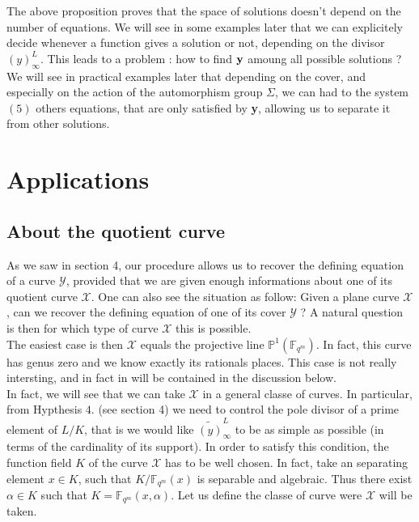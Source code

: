 \documentclass[10pt]{article}
\newcommand{\s}{\vspace{0.3cm}}
\newcommand{\fqm}{\mathbb{F}_{q^m}}
\newcommand{\X}{\mathcal{X}}
\newcommand{\Y}{\mathcal{Y}}
\begin{document}
\s

The above proposition proves that the space of solutions doesn't depend on the number of equations. 
We will see in some examples later that we can explicitely decide whenever a function gives a solution or not, depending on the divisor $(y)^L_{\infty}$. This leads to a problem : how to find $\bf{y}$ \rm amoung all possible solutions ? We will see in practical examples later that depending on the cover, and especially on the action of the automorphism group $\Sigma$,  we can had to the system $(5)$ others equations, that are only satisfied by \textbf{y}, allowing us to separate it from other solutions.

\s
\section{Applications}

\s

\subsection{About the quotient curve}

\s


As we saw in section 4, our procedure allows us to recover the defining equation of a curve $\Y$, provided that we are given enough informations about one of its quotient curve $\X$. One can also see the situation as follow: Given a plane curve $\X$, can we recover the defining equation of one of its cover $\Y$ ? A natural question is then for which type of curve $\X$ this is possible. \\


The easiest case is then $\X$ equals the projective line $\mathbb{P}^1(\fqm)$. In fact, this curve has genus zero and we know exactly its rationals places. This case is not really intersting, and in fact in will be contained in the discussion below.\\

In fact, we will see that we can take $\X$ in a general classe of curves. In particular, from Hypthesis $4.$ (see section 4) we need to control the pole divisor of a prime element of $L/K$, that is we would like $\widetilde{(y)}^L_{\infty}$ to be as simple as possible (in terms of the cardinality of its support). In order to satisfy this condition, the function field $K$ of the curve $\X$ has to be well chosen. In fact, take an separating element $x \in K$, such that $K/\fqm(x)$ is separable and algebraic. Thus there exist $\alpha \in K$ such that $K=\fqm(x,\alpha)$. Let us define the classe of curve were $\X$ will be taken.
\end{document}
